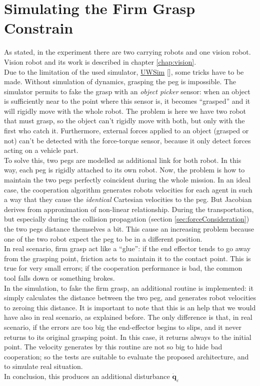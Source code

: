 \section{Simulating the Firm Grasp Constrain}
\label{sec:firmGrasp}
As stated, in the experiment there are two carrying robots and one vision robot. Vision robot and its work is described in chapter \ref{chap:vision}.\\
Due to the limitation of the used simulator, \href{http://www.irs.uji.es/uwsim/}{UWSim} [\cite{uwsim}], some tricks have to be made. Without simulation of dynamics, grasping the peg is impossible. The simulator permits to fake the grasp with an \textit{object picker} sensor: when an object is sufficiently near to the point where this sensor is, it becomes \enquote{grasped} and it will rigidly move with the whole robot. The problem is here we have two robot that must grasp, so the object can't rigidly move with both, but only with the first who catch it. Furthermore, external forces applied to an object (grasped or not) can't be detected with the force-torque sensor, because it only detect forces acting on a vehicle part.\\
To solve this, two pegs are modelled as additional link for both robot. In this way, each peg is rigidly attached to its own robot. Now, the problem is how to maintain the two pegs perfectly coincident during the whole mission. In an ideal case, the cooperation algorithm generates robots velocities for each agent in such a way that they cause the \textit{identical} Cartesian velocities to the peg. But Jacobian derives from approximation of non-linear relationship. During the transportation, but especially during the collision propagation (section \ref{sec:forceConsideration})
the two pegs distance themselves a bit. This cause an increasing problem because one of the two robot expect the peg to be in a different position.\\
In real scenario, firm grasp act like a \enquote{glue}: if the end effector tends to go away from the grasping point, friction acts to maintain it to the contact point. This is true for very small errors; if the cooperation performance is bad, the common tool falls down or something brokes.\\
In the simulation, to fake the firm grasp, an additional routine is implemented: it simply calculates the distance between the two peg, and generates robot velocities to zeroing this distance. It is important to note that this is an help that we would have also in real scenario, as explained before. The only difference is that, in real scenario, if the errors are too big the end-effector begins to slips, and it never returns to its original grasping point. In this case, it returns always to the initial point. The velocity generates by this routine are not so big to hide bad cooperation; so the tests are suitable to evaluate the proposed architecture, and to simulate real situation.\\
In conclusion, this produces an additional disturbance $\boldsymbol{\dot{q}}_{\varepsilon}$


